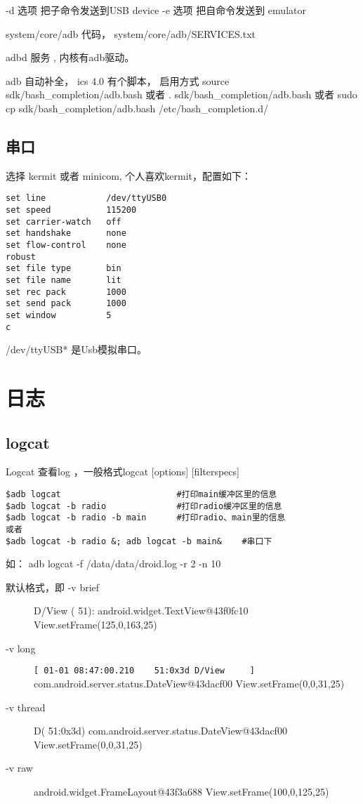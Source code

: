 \documentclass[a4paper,titlepage]{article}
\begin{document}
-d 选项  把子命令发送到USB device 
-e 选项  把自命令发送到 emulator

system/core/adb  代码，  system/core/adb/SERVICES.txt


adbd 服务 , 内核有adb驱动。


adb 自动补全， ics 4.0 有个脚本， 启用方式
source sdk/bash_completion/adb.bash
或者
. sdk/bash_completion/adb.bash
或者
sudo cp sdk/bash_completion/adb.bash /etc/bash_completion.d/

\subsection{串口}
选择 kermit 或者 minicom, 个人喜欢kermit，配置如下：
\begin{lstlisting}[caption=kermit的配置.kermrc, xleftmargin=8em,xrightmargin=8em, aboveskip=1em]
set line            /dev/ttyUSB0
set speed           115200
set carrier-watch   off
set handshake       none
set flow-control    none
robust
set file type       bin
set file name       lit
set rec pack        1000
set send pack       1000
set window          5
c
\end{lstlisting}

/dev/ttyUSB* 是Usb模拟串口。


\section{日志}
\subsection{logcat}
Logcat 查看log ，一般格式logcat [options] [filterspecs]
\begin{verbatim}
$adb logcat                       #打印main缓冲区里的信息 
$adb logcat -b radio              #打印radio缓冲区里的信息 
$adb logcat -b radio -b main      #打印radio、main里的信息
或者
$adb logcat -b radio &; adb logcat -b main&    #串口下
\end{verbatim}
 

如： adb logcat  -f  /data/data/droid.log -r 2  -n 10
\begin{description}
    \item [默认格式，即 -v brief]
        D/View    (   51): android.widget.TextView@43f0fc10 View.setFrame(125,0,163,25) 

    \item [-v long]
        \verb|[ 01-01 08:47:00.210    51:0x3d D/View     ] |\\
        com.android.server.status.DateView@43dacf00 View.setFrame(0,0,31,25)

    \item [-v thread]
        D(   51:0x3d) com.android.server.status.DateView@43dacf00 View.setFrame(0,0,31,25)

    \item [-v raw]
        android.widget.FrameLayout@43f3a688 View.setFrame(100,0,125,25) 
\end{description}
\end{document}
